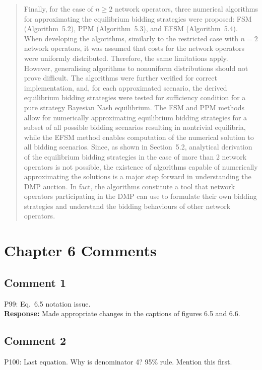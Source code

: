 \documentclass[10pt,a4paper,notitlepage]{article}
\numberwithin{equation}{section}
\begin{document}
\begin{quote}
Finally, for the case of $n\geq 2$ network operators, three numerical algorithms for approximating the equilibrium bidding strategies were proposed: FSM (Algorithm~5.2), PPM (Algorithm~5.3), and EFSM (Algorithm~5.4). When developing the algorithms, similarly to the restricted case with $n=2$ network operators, it was assumed that costs for the network operators were uniformly distributed. Therefore, the same limitations apply. However, generalising algorithms to nonuniform distributions should not prove difficult. The algorithms were further verified for correct implementation, and, for each approximated scenario, the derived equilibrium bidding strategies were tested for sufficiency condition for a pure strategy Bayesian Nash equilibrium. The FSM and PPM methods allow for numerically approximating equilibrium bidding strategies for a subset of all possible bidding scenarios resulting in nontrivial equilibria, while the EFSM method enables computation of the numerical solution to all bidding scenarios. Since, as shown in Section~5.2, analytical derivation of the equilibrium bidding strategies in the case of more than 2 network operators is not possible, the existence of algorithms capable of numerically approximating the solutions is a major step forward in understanding the DMP auction. In fact, the algorithms constitute a tool that network operators participating in the DMP can use to formulate their own bidding strategies and understand the bidding behaviours of other network operators.
\end{quote}

\clearpage

\section{Chapter 6 Comments}
\subsection{Comment 1}
P99: Eq.~6.5 notation issue.\\[-2ex]

\textbf{Response:}
Made appropriate changes in the captions of figures 6.5 and 6.6.

\subsection{Comment 2}
P100: Last equation. Why is denominator 4? 95\% rule. Mention this first.\\[-2ex]
\end{document}
